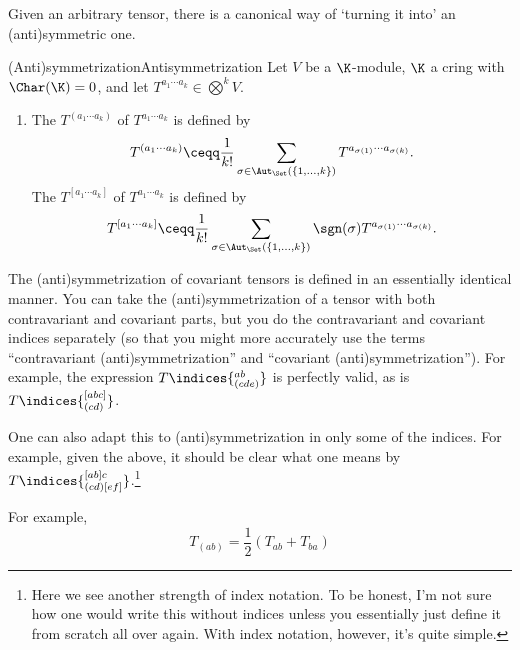Given an arbitrary tensor, there is a canonical way of `turning it into' an (anti)symmetric one.
\begin{dfn}{(Anti)symmetrization}{Antisymmetrization}
	Let $V$ be a $\K$-module, $\K$ a cring with $\Char (\K )=0$, and let $T^{a_1\cdots a_k}\in \bigotimes ^kV$.
	\begin{enumerate}
		\item The  $T^{(a_1\cdots a_k)}$ of $T^{a_1\cdots a_k}$ is defined by
		\begin{equation}
			T^{(a_1\cdots a_k)}\ceqq \frac{1}{k!}\sum _{\sigma \in \Aut _{\Set}(\{ 1,\ldots ,k\})}T^{a_{\sigma (1)}\cdots a_{\sigma (k)}}.
		\end{equation}
		The  $T^{[a_1\cdots a_k]}$ of $T^{a_1\cdots a_k}$ is defined by
		\begin{equation}
			T^{[a_1\cdots a_k]}\ceqq \frac{1}{k!}\sum _{\sigma \in \Aut _{\Set}(\{ 1,\ldots ,k\})}\sgn (\sigma )T^{a_{\sigma (1)}\cdots a_{\sigma (k)}}.
		\end{equation}
	\end{enumerate}
	\begin{rmk}
		The (anti)symmetrization of covariant tensors is defined in an essentially identical manner.  You can take the (anti)symmetrization of a tensor with both contravariant and covariant parts, but you do the contravariant and covariant indices separately (so that you might more accurately use the terms ``contravariant (anti)symmetrization'' and ``covariant (anti)symmetrization'').  For example, the expression $T\indices{^{ab}_{(cde)}}$ is perfectly valid, as is $T\indices{^{[abc]}_{(cd)}}$.
	\end{rmk}
	\begin{rmk}
		One can also adapt this to (anti)symmetrization in only some of the indices.  For example, given the above, it should be clear what one means by $T\indices{^{[ab]c}_{(cd)[ef]}}$.\footnote{Here we see another strength of index notation.  To be honest, I'm not sure how one would write this without indices unless you essentially just define it from scratch all over again.  With index notation, however, it's quite simple.}
	\end{rmk}
	\begin{rmk}
		For example,
		\begin{equation}
			T_{(ab)}=\frac{1}{2}(T_{ab}+T_{ba})
		\end{equation}

\end{rmk}
\end{dfn}
